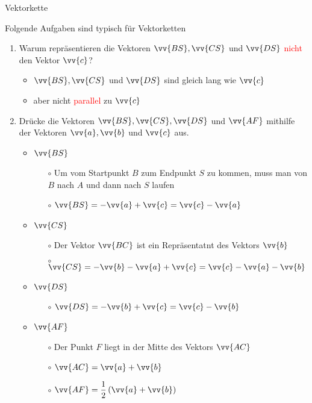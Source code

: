 \begin{bsp}{Vektorkette}{}
\begin{center}
\begin{tikzpicture}[font=\boldmath]
\end{tikzpicture}
\end{center}
Folgende Aufgaben sind typisch für Vektorketten
\begin{enumerate}
    \item Warum repräsentieren die Vektoren $\vv{BS}, \vv{CS}$ und $\vv{DS}$ \textcolor{red}{nicht} den Vektor $\vv{c}$?
    \begin{itemize}
        \item $\vv{BS}, \vv{CS}$ und $\vv{DS}$ sind gleich lang wie $\vv{c}$
        \item aber nicht \textcolor{red}{parallel} zu $\vv{c}$
    \end{itemize}
    \item Drücke die Vektoren $\vv{BS}, \vv{CS}, \vv{DS}$ und $\vv{AF}$ mithilfe der Vektoren $\vv{a}, \vv{b}$ und $\vv{
    c}$ aus.
    \begin{itemize}
        \item $\vv{BS}$
        \begin{itemize}
            \item[$\circ$] Um vom Startpunkt $B$ zum Endpunkt $S$ zu kommen, muss man von $B$ nach $A$ und dann nach $S$ \glqq laufen\grqq{}
            \item[$\circ$] $\vv{BS} = -\vv{a} + \vv{c} = \vv{c} - \vv{a}$
        \end{itemize}       
        \item $\vv{CS}$ 
        \begin{itemize}
            \item[$\circ$] Der Vektor $\vv{BC}$ ist ein Repräsentatnt des Vektors $\vv{b}$ 
            \item[$\circ$] $\vv{CS} = -\vv{b} - \vv{a} + \vv{c} = \vv{c} - \vv{a} -\vv{b}$
        \end{itemize}
        \item $\vv{DS}$ 
        \begin{itemize}
            \item[$\circ$] $\vv{DS} = -\vv{b} + \vv{c} = \vv{c} - \vv{b}$
        \end{itemize}
         \item $\vv{AF}$ 
         \begin{itemize}
             \item[$\circ$] Der Punkt $F$ liegt in der Mitte des Vektors $\vv{AC}$
             \item[$\circ$] $\vv{AC} = \vv{a} + \vv{b}$
             \item[$\circ$] $\vv{AF} = \dfrac{1}{2} \left(\vv{a} + \vv{b} \right)$

\end{itemize}
\end{itemize}
\end{enumerate}
\end{bsp}
